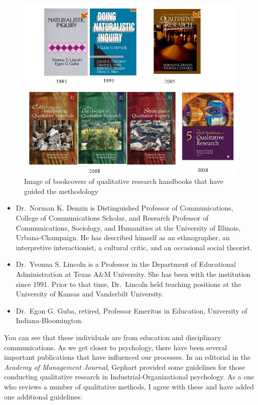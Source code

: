\documentclass[
  english,
]{book}
\providecommand{\tightlist}{%
  \setlength{\itemsep}{0pt}\setlength{\parskip}{0pt}}
\begin{document}
\begin{figure}
\centering
\includegraphics{images/Qualitative/handbooks.jpg}
\caption{Image of bookcovers of qualitative research handbooks that have guided the methodology}
\end{figure}

\begin{itemize}
\tightlist
\item
  Dr.~Norman K. Denzin is Distinguished Professor of Communications, College of Communications Scholar, and Research Professor of Communications, Sociology, and Humanities at the University of Illinois, Urbana-Champaign. He has described himself as an ethnographer, an interpretive interactionist, a cultural critic, and an occasional social theorist.
\item
  Dr.~Yvonna S. Lincoln is a Professor in the Department of Educational Administration at Texas A\&M University. She has been with the institution since 1991. Prior to that time, Dr.~Lincoln held teaching positions at the University of Kansas and Vanderbilt University.
\item
  Dr.~Egon G. Guba, retired, Professor Emeritus in Education, University of Indiana-Bloomington.
\end{itemize}

You can see that these individuals are from education and disciplinary communications. As we get closer to psychology, there have been several important publications that have influenced our processes. In an editorial in the \emph{Academy of Management Journal}, Gephart \citeyearpar{gephart_qualitative_2004} provided some guidelines for those conducting qualitative research in Industrial-Organizational psychology. As a one who reviews a number of qualitative methods, I agree with these and have added one additional guidelines:
\end{document}
